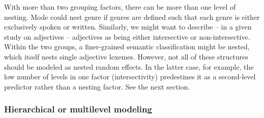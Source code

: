 \documentclass[a4paper,12pt]{article}
\begin{document}
With more than two grouping factors, there can be more than one level of nesting.
Mode could nest genre if genres are defined such that each genre is either exclusively spoken or written.
Similarly, we might want to describe -- in a given study on adjectives -- adjectives as being either intersective or non-intersective.
Within the two groups, a finer-grained semantic classification might be nested, which itself nests single adjective lexemes.
However, not all of these structures should be modeled as nested random effects.
In the latter case, for example, the low number of levels in one factor (intersectivity) predestines it as a second-level predictor rather than a nesting factor.
See the next section.

\subsubsection{Hierarchical or multilevel modeling}
\label{sec:hierarchicalormultilevelmodels}
\end{document}
